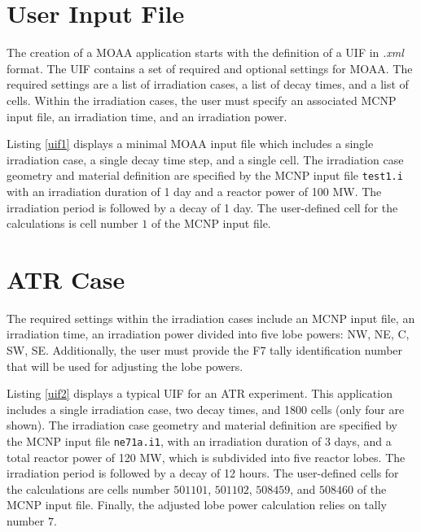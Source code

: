 \label{ref:moaa-exec}

\section{User Input File}
\label{sec:uif}

The creation of a MOAA application starts with the definition of a \gls*{UIF} in \textit{.xml} format.
The UIF contains a set of required and optional settings for MOAA.
The required settings are a list of irradiation cases, a list of decay times, and a list of cells.
Within the irradiation cases, the user must specify an associated MCNP input file, an irradiation time, and an irradiation power.

Listing \ref{uif1} displays a minimal MOAA input file which includes a single irradiation case, a single decay time step, and a single cell.
The irradiation case geometry and material definition are specified by the MCNP input file \texttt{test1.i} with an irradiation duration of 1 day and a reactor power of 100 MW.
The irradiation period is followed by a decay of 1 day.
The user-defined cell for the calculations is cell number $1$ of the MCNP input file.



\section{ATR Case}
\label{sec:ap-atr}

The required settings within the irradiation cases include an MCNP input file, an irradiation time, an irradiation power divided into five lobe powers: NW, NE, C, SW, SE.
Additionally, the user must provide the F7 tally identification number that will be used for adjusting the lobe powers.

Listing \ref{uif2} displays a typical UIF for an ATR experiment.
This application includes a single irradiation case, two decay times, and 1800 cells (only four are shown).
The irradiation case geometry and material definition are specified by the MCNP input file \texttt{ne71a.i1}, with an irradiation duration of 3 days, and a total reactor power of 120 MW, which is subdivided into five reactor lobes.
The irradiation period is followed by a decay of 12 hours.
The user-defined cells for the calculations are cells number $501101$, $501102$, $508459$, and $508460$ of the MCNP input file.
Finally, the adjusted lobe power calculation relies on tally number $7$.



